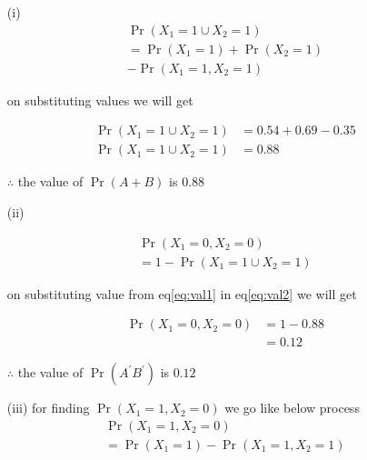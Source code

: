 \documentclass[journal,12pt,twocolumn]{IEEEtran}
\providecommand{\pr}[1]{\ensuremath{\Pr\left(#1\right)}}
\begin{document}
\begin{enumerate}



    \item[(i)]
           \begin{multline}
                \label{eq:sum}
                      \pr{X_{1} = 1 \cup X_{2} = 1} \\
                         = \pr{X_{1} = 1} + \pr{X_{2} = 1} \\
                                                    - \pr{X_{1} = 1,X_{2} = 1}
           \end{multline}
          
           on substituting values we will get 
          
           \begin{align}
               \pr{X_{1} = 1 \cup X_{2} = 1} &= 0.54 + 0.69 - 0.35 \\
               \pr{X_{1} = 1 \cup X_{2} = 1} &= 0.88
               \label{eq:val1}
           \end{align}
          
          $\therefore$ the value of $\pr{A+B}$ is $0.88$
          
          
          
    \item[(ii)]
    
           \begin{multline}
              \pr{X_{1} = 0,X_{2} = 0} \\
                                        =1 - \pr{X_{1} = 1 \cup X_{2} = 1}
                                         \label{eq:val2}
           \end{multline}  
           
           on substituting value from eq\eqref{eq:val1} in eq\eqref{eq:val2} we will get
           
           \begin{align}
              \pr{ X_{1} = 0 , X_{2} = 0 } &= 1 - 0.88 \\  
                                           &= 0.12
           \end{align}            
           
           $\therefore$ the value of $\pr{A^{\prime} B^{\prime}}$ is $0.12$
           
       
       
    \item[(iii)] for finding $\pr{X_{1} = 1 , X_{2} = 0}$ we go like below process  
            \begin{multline}
                     \pr{X_{1} = 1 ,X_{2} = 0} \\
                     =  \pr{X_{1} = 1} - \pr{X_{1} = 1 , X_{2} = 1}
                     \label{eq:axiom_sum_ABPP}
            \end{multline}
    

\end{enumerate}
\end{document}
